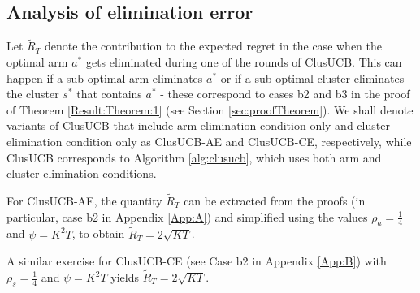 \subsection*{Analysis of elimination error}
Let $\tilde R_T$ denote the contribution  to the expected regret in the case when the optimal arm $a^*$ gets eliminated during one of the rounds of ClusUCB. This can happen if a sub-optimal arm eliminates $a^*$ or if a sub-optimal cluster eliminates the cluster $s^*$ that contains $a^*$ - these correspond to cases b2 and b3 in the proof of Theorem \ref{Result:Theorem:1} (see Section \ref{sec:proofTheorem}). 
We shall denote variants of ClusUCB that include arm elimination condition only and cluster elimination condition only as ClusUCB-AE and ClusUCB-CE, respectively, while ClusUCB corresponds to Algorithm \ref{alg:clusucb}, which uses both arm and cluster elimination conditions.

For ClusUCB-AE, the quantity $\tilde R_T$ can be extracted from the proofs (in particular, case b2 in Appendix \ref{App:A}) 
and simplified using the values $\rho_{a}=\frac{1}{4}$ and $\psi=K^{2}T$, to obtain $\tilde R_T = 2\sqrt{KT}$. 

A similar exercise for ClusUCB-CE (see Case b2 in Appendix \ref{App:B}) 
with $\rho_{s}=\frac{1}{4}$ and $\psi=K^{2}T$ yields $\tilde R_T = 2\sqrt{KT}$. 

